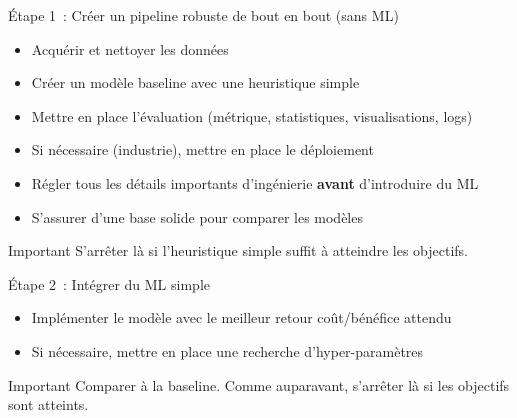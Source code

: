 \begin{frame}{Étape 1~: Créer un pipeline robuste de bout en bout (sans ML)}
  \begin{itemize}[<+->]
  \item Acquérir et nettoyer les données
  \item Créer un modèle baseline avec une heuristique simple
  \item Mettre en place l'évaluation (métrique, statistiques, visualisations, logs)
  \item Si nécessaire (industrie), mettre en place le déploiement
  \end{itemize}


  \begin{itemize}[<+->]
    \item Régler tous les détails importants d'ingénierie \textbf{avant} d'introduire du ML
    \item S'assurer d'une base solide pour comparer les modèles
  \end{itemize}

  \begin{alertblock}{Important}
    S'arrêter là si l'heuristique simple suffit à atteindre les objectifs.
  \end{alertblock}
\end{frame}

\begin{frame}{Étape 2~: Intégrer du ML simple}
  \begin{itemize}[<+->]
    \item Implémenter le modèle avec le meilleur retour coût/bénéfice attendu
    \item Si nécessaire, mettre en place une recherche d'hyper-paramètres
  \end{itemize}

  \begin{alertblock}{Important}
    Comparer à la baseline. Comme auparavant, s'arrêter là si les objectifs sont atteints.
  \end{alertblock}
\end{frame}

